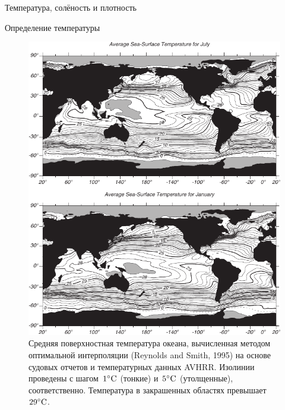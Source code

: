 \begin{chapter}{Температура, солёность и плотность}
\begin{section}{Определение температуры}
\begin{figure}[t!]
\includegraphics{pics/sst_climatology}
\caption{Средняя поверхностная температура океана, вычисленная методом
оптимальной интерполяции (Reynolds and Smith, 1995) на основе судовых отчетов
и температурных данных AVHRR. Изолинии проведены с шагом~${1}^\circ\mbox{C}$ (тонкие)
и~${5}^\circ\mbox{C}$ (утолщенные), соответственно.
Температура в закрашенных областях превышает~${29}^\circ\mbox{C}$.}
\label{fig:sst_climatology}
\end{figure}
%


\end{section}
\end{chapter}
